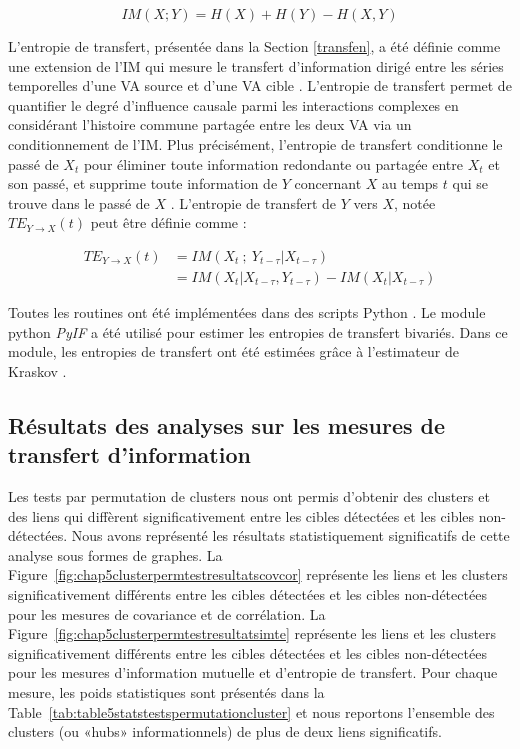 \begin{equation}
IM(X;Y) = H(X) + H(Y) - H(X,Y)
\end{equation}

L'entropie de transfert, présentée dans la Section \ref{transfen}, a été définie comme une extension de l'IM qui mesure le transfert d'information dirigé entre les séries temporelles d'une VA source et d'une VA cible \citep{schreiber2000,paluvs2001synchronization}. 
L'entropie de transfert permet de quantifier le degré d'influence causale parmi les interactions complexes en considérant l'histoire commune partagée entre les deux VA via un conditionnement de l'IM. 
Plus précisément, l'entropie de transfert conditionne le passé de $X_t$ pour éliminer toute information redondante ou partagée entre $X_t$ et son passé, et supprime toute information de $Y$ concernant $X$ au temps $t$ qui se trouve dans le passé de $X$ \citep{williams2011generalized, ikegwu2020pyif}. 
L'entropie de transfert de $Y$ vers $X$, notée $TE_{Y \rightarrow X}(t)$ peut être définie \citep{kraskov2004} comme :

\begin{equation}
\begin{split}
TE_{Y \rightarrow X}(t) &= IM(X_t~;~Y_{t-\tau}|X_{t-\tau}) \\
&= IM(X_t|X_{t-\tau},Y_{t-\tau}) - IM(X_t|X_{t-\tau})
\end{split}
\end{equation}

Toutes les routines ont été implémentées dans des scripts Python \citep{van2007python}.
Le module python \textit{PyIF} \citep{ikegwu2020pyif} a été utilisé pour estimer les entropies de transfert bivariés. 
Dans ce module, les entropies de transfert ont été estimées grâce à l'estimateur de Kraskov \citep{kraskov2004}. 

\subsection{Résultats des analyses sur les mesures de transfert d'information}
\label{resultatstransmissiondinfo}

Les tests par permutation de clusters nous ont permis d'obtenir des clusters et des liens qui diffèrent significativement entre les cibles détectées et les cibles non-détectées. 
Nous avons représenté les résultats statistiquement significatifs de cette analyse sous formes de graphes. 
La Figure~\ref{fig:chap5clusterpermtestresultatscovcor} représente les liens et les clusters significativement différents entre les cibles détectées et les cibles non-détectées pour les mesures de covariance et de corrélation. 
La Figure~\ref{fig:chap5clusterpermtestresultatsimte} représente les liens et les clusters significativement différents entre les cibles détectées et les cibles non-détectées pour les mesures d'information mutuelle et d'entropie de transfert. 
Pour chaque mesure, les poids statistiques sont présentés dans la Table~\ref{tab:table5statstestspermutationcluster} et nous reportons l'ensemble des clusters (ou «hubs» informationnels) de plus de deux liens significatifs. 

